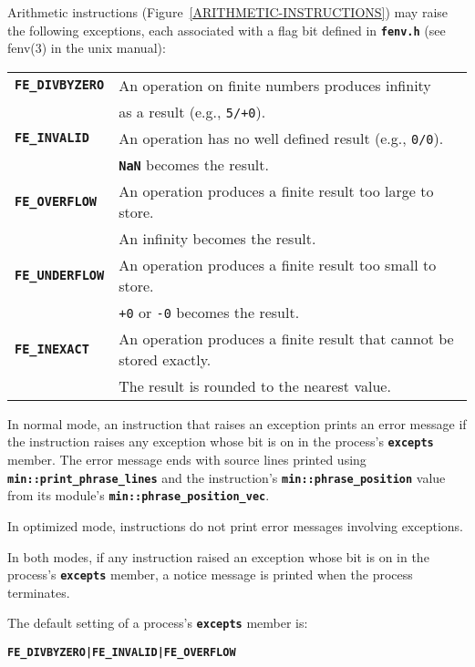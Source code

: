 \documentclass[12pt]{article}
\makeatletter
\newcommand{\TT}[1]{{\tt \bfseries #1}}
\newcommand{\ttkey}[1]{\TT{#1}\index{#1@{\tt #1}}}
\newcommand{\EOL}{\penalty \exhyphenpenalty}
\makeatother
\begin{document}
Arithmetic instructions (Figure~\ref{ARITHMETIC-INSTRUCTIONS})
may raise the following exceptions, each
associated with a flag bit defined in \TT{fenv.h}
(see fenv(3) in the unix manual):
\begin{center}
\begin{tabular}{|l|l|}
\hline
\ttkey{FE\_DIVBYZERO} &  An operation on finite numbers produces infinity \\
                      &  as a result (e.g., {\tt 5/+0}).
\\\hline
\ttkey{FE\_INVALID} & An operation has no well defined result
                      (e.g., {\tt 0/0}). \\
		    & \TT{NaN} becomes the result.
\\\hline
\ttkey{FE\_OVERFLOW} & An operation produces a finite result too large to
                       store. \\
		     & An infinity becomes the result.
\\\hline
\ttkey{FE\_UNDERFLOW} & An operation produces a finite result too small to
                        store. \\
	              & {\tt +0} or {\tt -0} becomes the result.
\\\hline
\ttkey{FE\_INEXACT} & An operation produces a finite result that cannot
                      be stored exactly. \\
		    & The result is rounded to the nearest value.
\\\hline
\end{tabular}
\end{center}

In normal mode, an instruction that raises an exception prints
an error message if the instruction raises any exception whose bit
is on in the process's \TT{excepts} member.
The error message ends with source lines printed
using \TT{min::\EOL print\_\EOL phrase\_\EOL lines} and the
instruction's \TT{min::phrase\_\EOL position} value from its module's
\TT{min::phrase\_\EOL position\_\EOL vec}.

In optimized mode, instructions do not print error messages
involving exceptions.

In both modes, if any instruction raised an exception whose bit
is on in the process's \TT{excepts} member, a notice message is
printed when the process terminates.

The default setting of a process's \TT{excepts} member
is:
\begin{center}
\TT{FE\_DIVBYZERO|FE\_INVALID|FE\_OVERFLOW}
\end{center}
\end{document}
